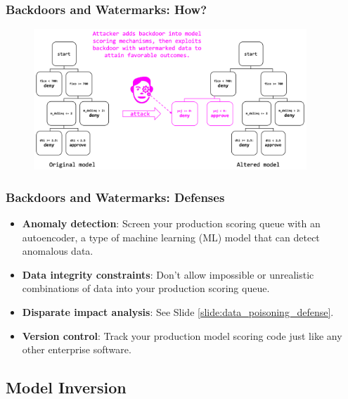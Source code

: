 \documentclass[11pt,
               aspectratio=169,
               hyperref={colorlinks}
               ]{beamer}
\begin{document}
			\begin{frame}
		
				\frametitle{Backdoors and Watermarks: \textbf{How?}}		
			
				\begin{figure}[htb]
					\begin{center}
						\includegraphics[height=150pt]{../img/watermark.PNG}
					\end{center}
				\end{figure}	

			\end{frame}
		
			\begin{frame}[label={slide:watermark_defense}]
		
				\frametitle{Backdoors and Watermarks: \textbf{Defenses}}
				\begin{itemize}
				\item \textbf{Anomaly detection}: Screen your production scoring queue with an autoencoder, a type of machine learning (ML) model that can detect anomalous data. 
				\item \textbf{Data integrity constraints}: Don’t allow impossible or unrealistic combinations of data into your production scoring queue.
				\item \textbf{Disparate impact analysis}: See Slide \ref{slide:data_poisoning_defense}.
				\item \textbf{Version control}: Track your production model scoring code just like any other enterprise software.
				\end{itemize}
				
			\end{frame}


		\subsection{Model Inversion}
			
\end{document}
